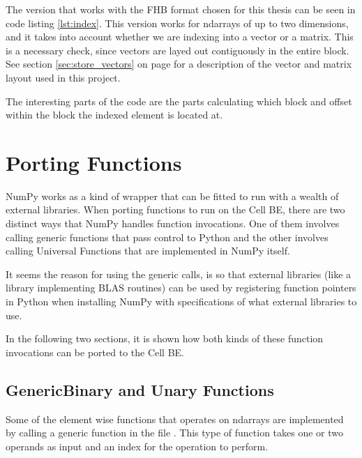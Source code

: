 The version that works with the FHB format chosen for this thesis can
be seen in code listing \ref{lst:index}. This version works for
ndarrays of up to two dimensions, and it takes into account whether we
are indexing into a vector or a matrix. This is a necessary check,
since vectors are layed out contiguously in the entire block. See
section \ref{sec:store_vectors} on page \pageref{sec:store_vectors}
for a description of the vector and matrix layout used in this
project.

The interesting parts of the code are the parts calculating which block and offset within the block
the indexed element is located at.


\section{Porting Functions}
NumPy works as a kind of wrapper that can be fitted to run with a wealth of external libraries.
When porting functions to run on the Cell BE, there are two distinct ways that NumPy handles function invocations.
One of them involves calling generic functions that pass control to Python and the other involves calling
Universal Functions that are implemented in NumPy itself.

It seems the reason for using the generic calls, is so that external libraries (like a library implementing BLAS routines) can
be used by registering function pointers in Python when installing NumPy with specifications of what external
libraries to use.

In the following two sections, it is shown how both kinds of these function invocations can be ported to the Cell BE.

\subsection{GenericBinary and Unary Functions}

Some of the element wise functions that operates on ndarrays are
implemented by calling a generic function in the
file . This type of function takes one or two
operands as input and an index for the operation to perform.


